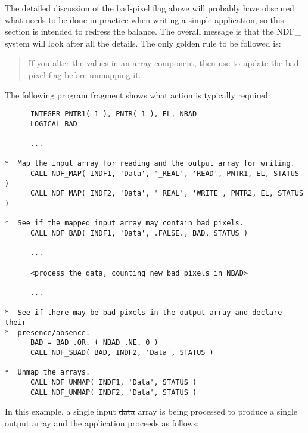 The detailed discussion of the \st{bad\/}-pixel flag above will probably have
obscured what needs to be done in practice when writing a simple application,
so this section is intended to redress the balance. 
The overall message is that the NDF\_ system will look after all 
the details.
The only golden rule to be followed is:

\begin{quote}
\begin{center}
\st{If you alter the values in an array component, then use  to 
update the bad-pixel flag before unmapping it.}
\end{center}
\end{quote}

The following program fragment shows what action is typically required:

\small
\begin{verbatim}
      INTEGER PNTR1( 1 ), PNTR( 1 ), EL, NBAD
      LOGICAL BAD

      ...

*  Map the input array for reading and the output array for writing.
      CALL NDF_MAP( INDF1, 'Data', '_REAL', 'READ', PNTR1, EL, STATUS )
      CALL NDF_MAP( INDF2, 'Data', '_REAL', 'WRITE', PNTR2, EL, STATUS )

*  See if the mapped input array may contain bad pixels.
      CALL NDF_BAD( INDF1, 'Data', .FALSE., BAD, STATUS )

      ...

      <process the data, counting new bad pixels in NBAD>

      ...

*  See if there may be bad pixels in the output array and declare their
*  presence/absence.
      BAD = BAD .OR. ( NBAD .NE. 0 )
      CALL NDF_SBAD( BAD, INDF2, 'Data', STATUS )

*  Unmap the arrays.
      CALL NDF_UNMAP( INDF1, 'Data', STATUS )
      CALL NDF_UNMAP( INDF2, 'Data', STATUS )
\end{verbatim}
\normalsize

In this example, a single input \st{data\/} array is being processed to produce a
single output array and the application proceeds as follows:

